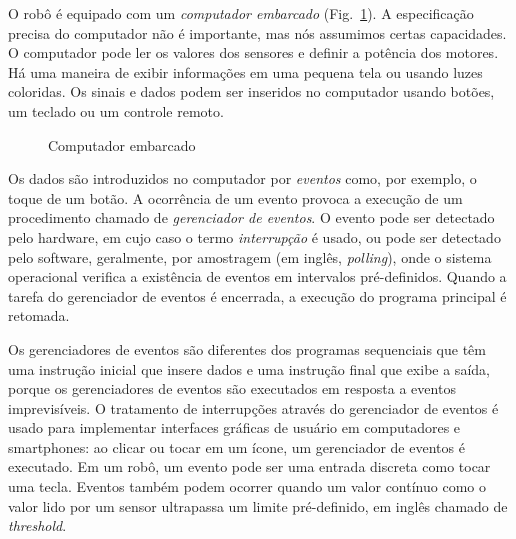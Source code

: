 O robô é equipado com um \emph{computador embarcado} (Fig.~\ref{fig.computer}). A especificação precisa do computador não é importante, mas nós assumimos certas capacidades. O computador pode ler os valores dos sensores e definir a potência dos motores. Há uma maneira de exibir informações em uma pequena tela ou usando luzes coloridas. Os sinais e dados podem ser inseridos no computador usando botões, um teclado ou um controle remoto.

\begin{figure}
\begin{center}
\caption{Computador embarcado}\label{fig.computer}
\end{center}
\end{figure}

Os dados são introduzidos no computador por \emph{eventos} como, por exemplo, o toque de um botão. A ocorrência de um evento provoca a execução de um procedimento chamado de \emph{gerenciador de eventos}. O evento pode ser detectado pelo hardware, em cujo caso o termo \emph{interrupção} é usado, ou pode ser detectado pelo software, geralmente, por amostragem (em inglês, \emph{polling}), onde o sistema operacional verifica a existência de eventos em intervalos pré-definidos. Quando a tarefa do gerenciador de eventos é encerrada, a execução do programa principal é retomada.

Os gerenciadores de eventos são diferentes dos programas sequenciais que têm uma instrução inicial que insere dados e uma instrução final que exibe a saída, porque os gerenciadores de eventos são executados em resposta a eventos imprevisíveis. O tratamento de interrupções através do gerenciador de eventos é usado para implementar interfaces gráficas de usuário em computadores e smartphones: ao clicar ou tocar em um ícone, um gerenciador de eventos é executado. Em um robô, um evento pode ser uma entrada discreta como tocar uma tecla. Eventos também podem ocorrer quando um valor contínuo como o valor lido por um sensor ultrapassa um limite pré-definido, em inglês chamado de \emph{threshold}.

